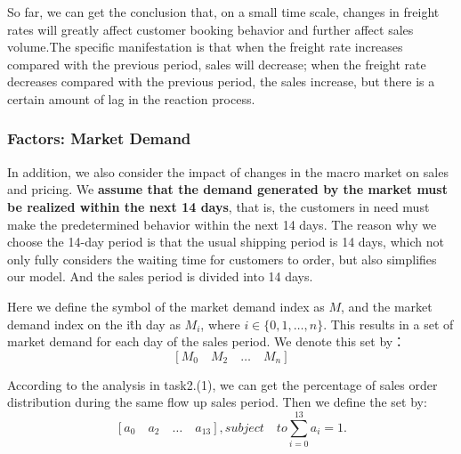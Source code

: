 So far, we can get the conclusion that, on a small time scale, changes in freight rates will greatly affect customer booking behavior and further affect sales volume.The specific manifestation is that when the freight rate increases compared with the previous period, sales will decrease; when the freight rate decreases compared with the previous period, the sales increase, but there is a certain amount of lag in the reaction process.
\subsubsection{Factors: Market Demand}
In addition, we also consider the impact of changes in the macro market on sales and pricing. We \textbf{assume that the demand generated by the market must be realized within the next 14 days}, that is, the customers in need must make the predetermined behavior within the next 14 days. The reason why we choose the 14-day period is that the usual shipping period is 14 days, which not only fully considers the waiting time for customers to order, but also simplifies our model. And the sales period is divided into 14 days.

Here we define the symbol of the market demand index as $M$, and the market demand index on the i\^th day as $M_i$, where $i\in\{0,1,\dots,n \}$. This results in a set of market demand for each day of the sales period. We denote this set by：$$[M_0\quad M_2\quad \dots \quad M_{n}]$$

According to the analysis in task2.(1), we can get the percentage of sales order distribution during the same flow up sales period. Then we define the set by:
$$[a_0\quad a_2\quad \dots \quad a_{13}], subject\quad to \sum_{i=0}^{13}a_i = 1.$$

